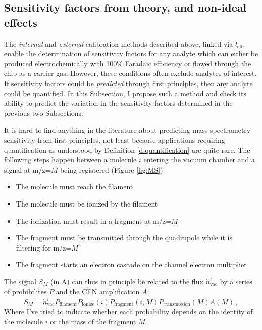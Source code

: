 \subsection{Sensitivity factors from theory, and non-ideal effects}\label{subsec:MS_theory}

The \textit{internal} and \textit{external} calibration methods described above, linked via $l_\text{eff}$, enable the determination of sensitivity factors for any analyte which can either be produced electrochemically with 100\% Faradaic efficiency or flowed through the chip as a carrier gas. However, these conditions often exclude analytes of interest. If sensitivity factors could be \textit{predicted} through first principles, then any analyte could be quantified. In this Subsection, I propose such a method and check its ability to predict the variation in the sensitivity factors determined in the previous two Subsections.

It is hard to find anything in the literature about predicting mass spectrometry sensitivity from first principles, not least because applications requiring quantification as understood by Definition \ref{d:quantification} are quite rare. The following steps happen between a molecule $i$ entering the vacuum chamber and a signal at m/z=$M$ being registered (Figure \ref{fig:MS})\cite{Gross2007}:
\begin{itemize}
	\item
	The molecule must reach the filament
	\item
	The molecule must be ionized by the filament
	\item
	The ionization must result in a fragment at m/z=$M$
	\item
	The fragment must be transmitted through the quadrupole while it is filtering for m/z=$M$
	\item
	The fragment starts an electron cascade on the channel electron multiplier
\end{itemize}
The signal $S_M$ (in A) can thus in principle be related to the flux $\dot{n}^i_\text{vac}$ by a series of probibilites $P$ and the CEN amplification $A$:
\begin{equation}
S_M = \dot{n}^i_\text{vac} P_\text{filament} P_\text{ionize}(i) P_\text{fragment}(i, M) P_\text{transmission}(M) A(M)\,,
\end{equation}
Where I've tried to indicate whether each probability depends on the identity of the molecule $i$ or the mass of the fragment $M$.


